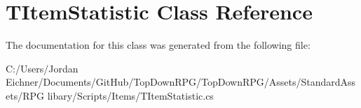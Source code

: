 \hypertarget{class_t_item_statistic}{}\section{T\+Item\+Statistic Class Reference}
\label{class_t_item_statistic}


The documentation for this class was generated from the following file\+:\begin{DoxyCompactItemize}
\item 
C\+:/\+Users/\+Jordan Eichner/\+Documents/\+Git\+Hub/\+Top\+Down\+R\+P\+G/\+Top\+Down\+R\+P\+G/\+Assets/\+Standard\+Assets/\+R\+P\+G libary/\+Scripts/\+Items/T\+Item\+Statistic.\+cs\end{DoxyCompactItemize}
